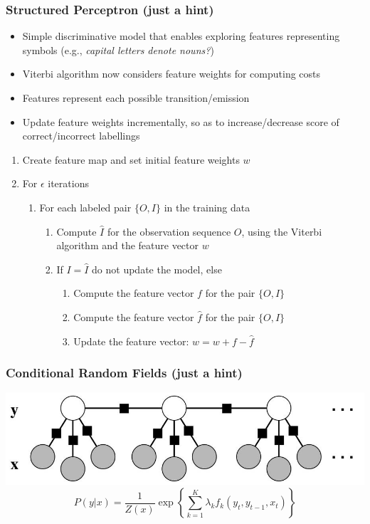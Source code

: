 \documentclass{beamer}
\begin{document}
\begin{frame} \frametitle{Structured Perceptron (just a hint)}
  
   \begin{itemize}
   \scriptsize
   \item Simple discriminative model that enables exploring features representing symbols (e.g., {\it capital letters denote nouns?})
   \item Viterbi algorithm now considers feature weights for computing costs
   \item Features represent each possible transition/emission
   \item Update feature weights incrementally, so as to increase/decrease score of correct/incorrect labellings
   \end{itemize}
  
   \begin{block}{}
   \begin{enumerate}
   \item Create feature map and set initial feature weights $w$
   \item For $\epsilon$ iterations
   \begin{enumerate}
   \item For each labeled pair $\{O,I\}$ in the training data
   \begin{enumerate}
   \item Compute $\hat{I}$ for the observation sequence $O$, using the Viterbi algorithm and the feature vector $w$
   \item If $I=\hat{I}$ do not update the model, else
   \begin{enumerate}
   \item Compute the feature vector $f$ for the pair $\{O,I\}$
   \item Compute the feature vector $\hat{f}$ for the pair $\{O,\hat{I}\}$
   \item Update the feature vector: $w = w + f - \hat{f}$
   \end{enumerate}
   \end{enumerate}
   \end{enumerate}
   \end{enumerate}
   \end{block}
 
 \end{frame}

 \begin{frame}
     \frametitle{Conditional Random Fields (just a hint)}
     \centering
     \includegraphics[width=.9\linewidth]{crf}
     \begin{displaymath}
         P(y|x) = \frac{1}{Z(x)}\exp\left\{\sum_{k=1}^K\lambda_kf_k(y_t, y_{t-1}, x_t)\right\}
     \end{displaymath}
 \end{frame}
\end{document}

